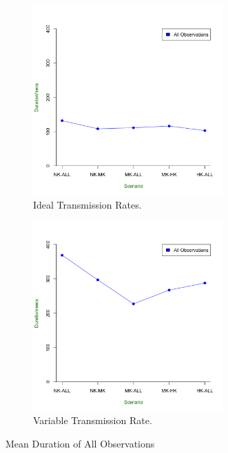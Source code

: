 \begin{figure}[ht!]
\centering 
\begin{subfigure}{0.7\textwidth}
  \includegraphics[width=0.8\textwidth]{Chap7/figures/ideal/all_total}
	\caption{Ideal Transmission Rates.}
	\label{fig:res:ideal:dur}
\end{subfigure}
\begin{subfigure}{0.7\textwidth}
  \includegraphics[width=0.8\textwidth]{Chap7/figures/real/all_total}
	\caption{Variable Transmission Rate.}
	\label{fig:real:dur}
\end{subfigure}
\caption{Mean Duration of All Observations}
\label{fig:mean:dur}
\end{figure}


